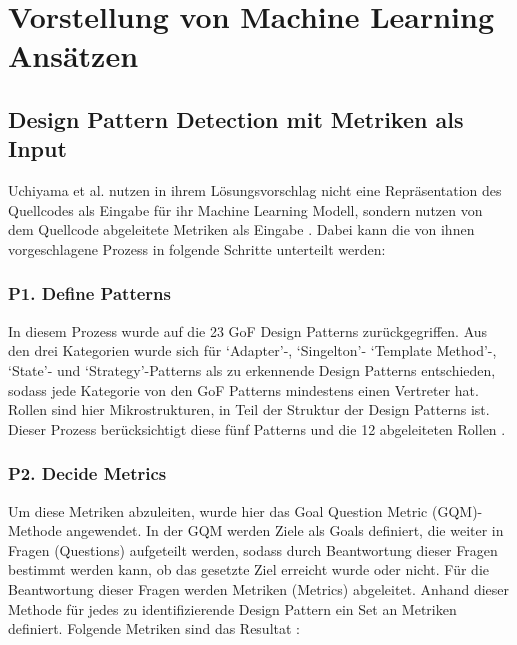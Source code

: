 \documentclass[conference]{IEEEtran}
\begin{document}
\newpage

\section{Vorstellung von Machine Learning Ansätzen}

\subsection{Design Pattern Detection mit Metriken als Input}

Uchiyama et al. nutzen in ihrem Lösungsvorschlag nicht eine Repräsentation des Quellcodes als Eingabe für ihr Machine Learning Modell, sondern nutzen von dem Quellcode abgeleitete Metriken als Eingabe \cite{dodmetrics}.
Dabei kann die von ihnen vorgeschlagene Prozess in folgende Schritte unterteilt werden:


\subsubsection*{P1. Define Patterns}
In diesem Prozess wurde auf die 23 GoF Design Patterns zurückgegriffen. Aus den drei Kategorien wurde sich für `Adapter'-, `Singelton'- `Template Method'-, `State'- und `Strategy'-Patterns als zu erkennende Design Patterns entschieden, sodass jede Kategorie von den GoF Patterns mindestens einen Vertreter hat. Rollen sind hier Mikrostrukturen, in Teil der Struktur der Design Patterns ist. Dieser Prozess berücksichtigt diese fünf Patterns und die 12 abgeleiteten Rollen \cite[p. 4]{dodmetrics}.

\subsubsection*{P2. Decide Metrics}
Um diese Metriken abzuleiten, wurde hier das Goal Question Metric (GQM)-Methode angewendet. In der GQM werden Ziele als Goals definiert, die weiter in Fragen (Questions) aufgeteilt werden, sodass durch Beantwortung dieser Fragen bestimmt werden kann, ob das gesetzte Ziel erreicht wurde oder nicht. Für die Beantwortung dieser Fragen werden Metriken (Metrics) abgeleitet. Anhand dieser Methode für jedes zu identifizierende Design Pattern ein Set an Metriken definiert.
Folgende Metriken sind das Resultat \cite[p. 7]{dodmetrics}:
\end{document}
